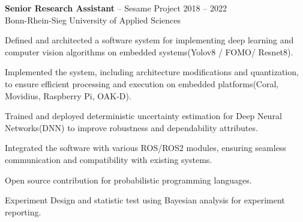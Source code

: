 \documentclass{article}
\newcommand{\employer}[4]{{
\vspace*{2pt}%
\textbf{#1} #2 \hfill #3\\ #4 \vspace*{2pt}}
}
\renewcommand{\labelitemii}{
	\raisebox{0.3ex}{\tiny\textbullet}
}
\newenvironment{bullet-list-minor}{
\begin{list}{\labelitemii}{\setlength\leftmargin{15pt} 
\topsep 0pt \itemsep -2pt}}{\vspace*{4pt}\end{list}
}
\begin{document}
    \employer{Senior Research Assistant}{-- Sesame Project}{2018 -- 2022}
    {Bonn-Rhein-Sieg University of Applied Sciences}
	\begin{bullet-list-minor}
		\item  Defined and architected a software system for implementing deep learning and computer vision algorithms on embedded systems(Yolov8 / FOMO/ Resnet8).
		\item  Implemented the system, including architecture modifications and quantization, to ensure efficient processing and execution on embedded platforms(Coral, Movidius, Raspberry Pi, OAK-D).
		\item  Trained and deployed deterministic uncertainty estimation for Deep Neural Networks(DNN) to improve robustness and dependability attributes.
		\item  Integrated the software with various ROS/ROS2 modules, ensuring seamless communication and compatibility with existing systems.
		\item  Open source contribution for probabilistic programming languages.
		\item  Experiment Design and statistic test using Bayesian analysis for experiment reporting.
    \end{bullet-list-minor}
    
\end{document}
